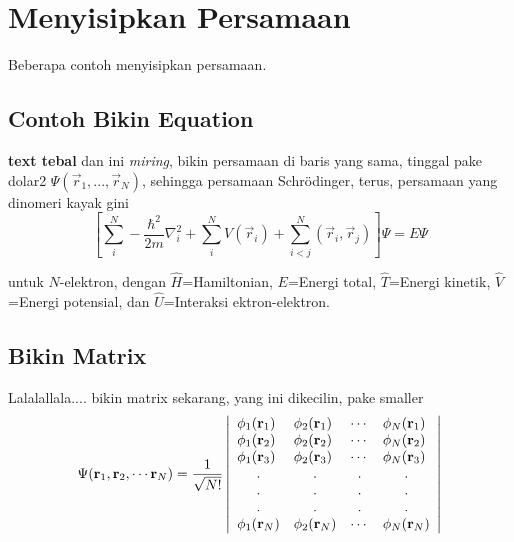 \section{Menyisipkan Persamaan}

Beberapa contoh menyisipkan persamaan.


\subsection{Contoh Bikin Equation}
\textbf{text tebal} dan ini \emph{miring}, bikin persamaan di baris yang sama, tinggal pake dolar2 $\Psi(\vec{r}_1,...,\vec{r}_N)$, sehingga persamaan Schr\"{o}dinger, terus, persamaan yang dinomeri kayak gini 
\begin{equation}
	\left[ \sum_{i}^{N}-\frac{\hbar^2}{2m}\nabla_i^2 + \sum_{i}^{N}V(\vec{r}_i)+ \sum_{i<j}^{N}(\vec{r}_i,\vec{r}_j)\right]\Psi = E\Psi 
\end{equation}

untuk $N$-elektron, dengan $\hat{H}$=Hamiltonian, $E$=Energi total, $\hat{T}$=Energi kinetik, $\hat{V}$=Energi potensial, dan $\hat{U}$=Interaksi ektron-elektron.

\subsection{Bikin Matrix}
Lalalallala.... bikin matrix sekarang, yang ini dikecilin, pake smaller
	{\smaller
		\begin{equation}
			\Psi({\bf r}_1, {\bf r}_2, \cdots {\bf r}_N) = \frac{1}{\sqrt{N!}}\left| \begin{array}{llcl}
				\phi_1({\bf r}_1)     & \phi_2({\bf r}_1)     & \cdots                & \phi_N({\bf r}_1)     \\
				\phi_1({\bf r}_2)     & \phi_2({\bf r}_2)     & \cdots                & \phi_N({\bf r}_2)     \\
				\phi_1({\bf r}_3)     & \phi_2({\bf r}_3)     & \cdots                & \phi_N({\bf r}_3)     \\
				\multicolumn{1}{c}{.} & \multicolumn{1}{c}{.} & \multicolumn{1}{c}{.} & \multicolumn{1}{c}{.} \\
				\multicolumn{1}{c}{.} & \multicolumn{1}{c}{.} & \multicolumn{1}{c}{.} & \multicolumn{1}{c}{.} \\
				\multicolumn{1}{c}{.} & \multicolumn{1}{c}{.} & \multicolumn{1}{c}{.} & \multicolumn{1}{c}{.} \\
				\phi_1({\bf r}_N)     & \phi_2({\bf r}_N)     & \cdots                & \phi_N({\bf r}_N)     \\
			\end{array} \right|
		\end{equation}
	}

